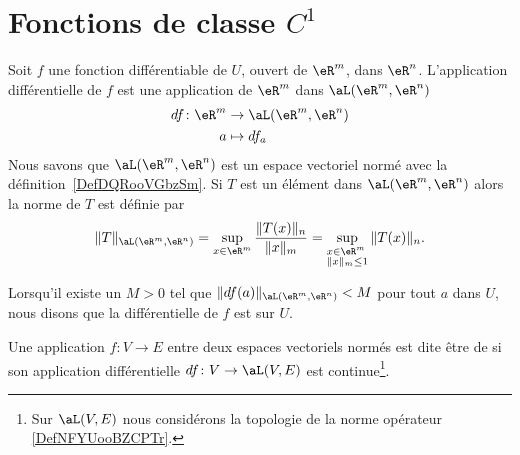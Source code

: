 
\section{Fonctions de classe \texorpdfstring{$ C^1$}{C1}}

Soit $f$ une fonction différentiable de $U$, ouvert de $\eR^m$, dans $\eR^n$. L'application différentielle de $f$ est une application  de $\eR^m$ dans $\aL(\eR^m, \eR^n)$
\begin{equation}
    \begin{aligned}
        df\colon \eR^m&\to \aL(\eR^m,\eR^n) \\
        a&\mapsto df_a 
    \end{aligned}
\end{equation}
Nous savons que $\aL(\eR^m, \eR^n)$ est un espace vectoriel normé avec la définition~\ref{DefDQRooVGbzSm}. Si $T$ est un élément dans $\aL(\eR^m, \eR^n)$ alors la norme de $T$ est définie par
\[
\|T\|_{\aL(\eR^m, \eR^n)}=\sup_{x\in\eR^m} \frac{\|T(x)\|_n}{\|x\|_m}=\sup_{\begin{subarray}{l}
    x\in\eR^m\\
\|x\|_m\leq 1
  \end{subarray}} \|T(x)\|_n.
\]

Lorsqu'il existe un $M>0$ tel que $\| df(a) \|_{\aL(\eR^m,\eR^n)}<M$ pour tout $a$ dans $U$, nous disons que la différentielle de $f$ est  sur $U$.

\begin{definition}
    Une application \( f\colon V\to E\) entre deux espaces vectoriels normés est dite être de  si son application différentielle \( df\colon V\to \aL(V,E)\) est continue\footnote{Sur \( \aL(V,E)\) nous considérons la topologie de la norme opérateur \ref{DefNFYUooBZCPTr}.}.
\end{definition}

